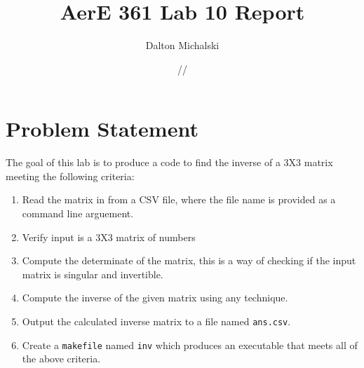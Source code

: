 \documentclass[11pt]{report}
\title{\textbf{AerE 361 Lab 10 Report}}
\author{Dalton Michalski}
\date{\oldstylenums{10}/\oldstylenums{30}/\oldstylenums{2018}}
\newcommand{\code}[1]{\colorbox{light-gray}{\texttt{#1}}}
\begin{document}
\maketitle
 
\section{Problem Statement}
\begin{item}
\item The goal of this lab is to produce a code to find the inverse of a 3X3 matrix meeting the following criteria: \begin{enumerate}
    \item Read the matrix in from a CSV file, where the file name is provided as a command line arguement.
    \item Verify input is a 3X3 matrix of numbers
    \item Compute the determinate of the matrix, this is a way of checking if the input matrix is singular and invertible.
    \item Compute the inverse of the given matrix using any technique.
    \item Output the calculated inverse matrix to a file named \code{ans.csv}.
    \item Create a \code{makefile} named \code{inv} which produces an executable that meets all of the above criteria.
\end{enumerate}
\end{item}
\end{document}
